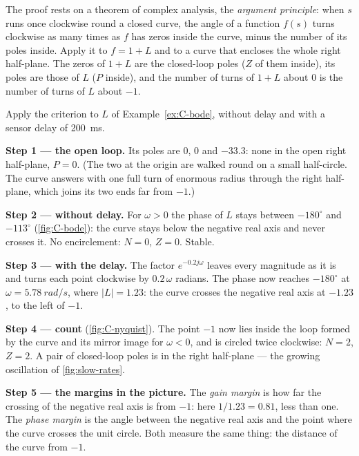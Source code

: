 The proof rests on a theorem of complex analysis, the \emph{argument principle}: when $s$ runs once clockwise round a closed curve, the angle of a function $f(s)$ turns clockwise as many times as $f$ has zeros inside the curve, minus the number of its poles inside. Apply it to $f = 1 + L$ and to a curve that encloses the whole right half-plane. The zeros of $1 + L$ are the closed-loop poles ($Z$ of them inside), its poles are those of $L$ ($P$ inside), and the number of turns of $1 + L$ about $0$ is the number of turns of $L$ about $-1$.

\begin{example}
\label{ex:C-nyquist}
Apply the criterion to $L$ of Example~\ref{ex:C-bode}, without delay and with a sensor delay of \SI{200}{ms}.

\textbf{Step 1 — the open loop.} Its poles are $0$, $0$ and $-33.3$: none in the open right half-plane, $P = 0$. (The two at the origin are walked round on a small half-circle. The curve answers with one full turn of enormous radius through the right half-plane, which joins its two ends far from $-1$.)

\textbf{Step 2 — without delay.} For $\omega > 0$ the phase of $L$ stays between $-180^\circ$ and $-113^\circ$ (\cref{fig:C-bode}): the curve stays below the negative real axis and never crosses it. No encirclement: $N = 0$, $Z = 0$. Stable.

\textbf{Step 3 — with the delay.} The factor $e^{-0.2j\omega}$ leaves every magnitude as it is and turns each point clockwise by $0.2\,\omega$ radians. The phase now reaches $-180^\circ$ at $\omega = \SI{5.78}{rad/s}$, where $|L| = 1.23$: the curve crosses the negative real axis at $-1.23$, to the left of $-1$.

\textbf{Step 4 — count} (\cref{fig:C-nyquist}). The point $-1$ now lies inside the loop formed by the curve and its mirror image for $\omega < 0$, and is circled twice clockwise: $N = 2$, $Z = 2$. A pair of closed-loop poles is in the right half-plane — the growing oscillation of \cref{fig:slow-rates}.

\textbf{Step 5 — the margins in the picture.} The \emph{gain margin} is how far the crossing of the negative real axis is from $-1$: here $1/1.23 = 0.81$, less than one. The \emph{phase margin} is the angle between the negative real axis and the point where the curve crosses the unit circle. Both measure the same thing: the distance of the curve from $-1$.
\end{example}

